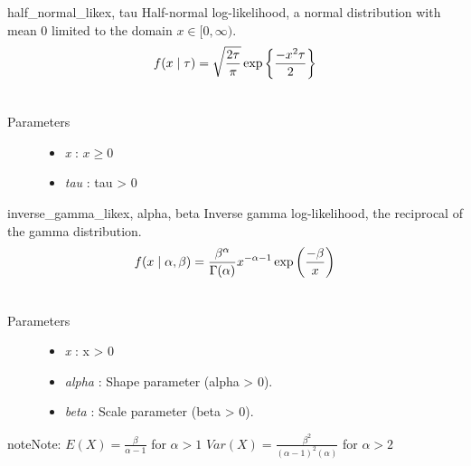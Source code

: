 \hypertarget{pymc.distributions.half_normal_like}{}\begin{funcdesc}{half\_normal\_like}{x, tau}
Half-normal log-likelihood, a normal distribution with mean 0 limited
to the domain $x \in [0, \infty)$.
\begin{gather}
\begin{split}f(x \mid \tau) = \sqrt{\frac{2\tau}{\pi}}\exp\left\{ {\frac{-x^2 \tau}{2}}\right\}\end{split}\notag\\\begin{split}\end{split}\notag
\end{gather}\begin{description}
\item[Parameters] \leavevmode\begin{itemize}
\item {} 
\emph{x} : $x \ge 0$

\item {} 
\emph{tau} : tau \textgreater{} 0

\end{itemize}

\end{description}
\end{funcdesc}

\hypertarget{pymc.distributions.inverse_gamma_like}{}\begin{funcdesc}{inverse\_gamma\_like}{x, alpha, beta}
Inverse gamma log-likelihood, the reciprocal of the gamma distribution.
\begin{gather}
\begin{split}f(x \mid \alpha, \beta) = \frac{\beta^{\alpha}}{\Gamma(\alpha)} x^{-\alpha - 1} \exp\left(\frac{-\beta}{x}\right)\end{split}\notag\\\begin{split}\end{split}\notag
\end{gather}\begin{description}
\item[Parameters] \leavevmode\begin{itemize}
\item {} 
\emph{x} : x \textgreater{} 0

\item {} 
\emph{alpha} : Shape parameter (alpha \textgreater{} 0).

\item {} 
\emph{beta} : Scale parameter (beta \textgreater{} 0).

\end{itemize}

\end{description}

\begin{notice}{note}{Note:}
$E(X)=\frac{\beta}{\alpha-1}$  for $\alpha > 1$
$Var(X)=\frac{\beta^2}{(\alpha-1)^2(\alpha)}$  for $\alpha > 2$
\end{notice}
\end{funcdesc}

